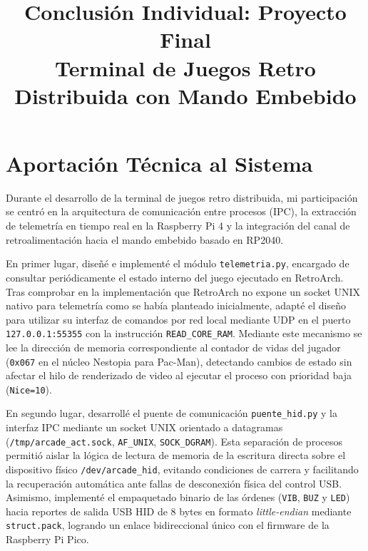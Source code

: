 \documentclass[conference]{IEEEtran}
\begin{document}
\title{Conclusión Individual: Proyecto Final \\
\large Terminal de Juegos Retro Distribuida con Mando Embebido}

\author{
}

\maketitle

\section*{Aportación Técnica al Sistema}

Durante el desarrollo de la terminal de juegos retro distribuida, mi participación se centró en la arquitectura de comunicación entre procesos (IPC), la extracción de telemetría en tiempo real en la Raspberry Pi 4 y la integración del canal de retroalimentación hacia el mando embebido basado en RP2040.

En primer lugar, diseñé e implementé el módulo \texttt{telemetria.py}, encargado de consultar periódicamente el estado interno del juego ejecutado en RetroArch. Tras comprobar en la implementación que RetroArch no expone un socket UNIX nativo para telemetría como se había planteado inicialmente, adapté el diseño para utilizar su interfaz de comandos por red local mediante UDP en el puerto \texttt{127.0.0.1:55355} con la instrucción \texttt{READ\_CORE\_RAM}. Mediante este mecanismo se lee la dirección de memoria correspondiente al contador de vidas del jugador (\texttt{0x067} en el núcleo Nestopia para Pac-Man), detectando cambios de estado sin afectar el hilo de renderizado de video al ejecutar el proceso con prioridad baja (\texttt{Nice=10}).

En segundo lugar, desarrollé el puente de comunicación \texttt{puente\_hid.py} y la interfaz IPC mediante un socket UNIX orientado a datagramas (\texttt{/tmp/arcade\_act.sock}, \texttt{AF\_UNIX}, \texttt{SOCK\_DGRAM}). Esta separación de procesos permitió aislar la lógica de lectura de memoria de la escritura directa sobre el dispositivo físico \texttt{/dev/arcade\_hid}, evitando condiciones de carrera y facilitando la recuperación automática ante fallas de desconexión física del control USB. Asimismo, implementé el empaquetado binario de las órdenes (\texttt{VIB}, \texttt{BUZ} y \texttt{LED}) hacia reportes de salida USB HID de 8 bytes en formato \textit{little-endian} mediante \texttt{struct.pack}, logrando un enlace bidireccional único con el firmware de la Raspberry Pi Pico.
\end{document}
